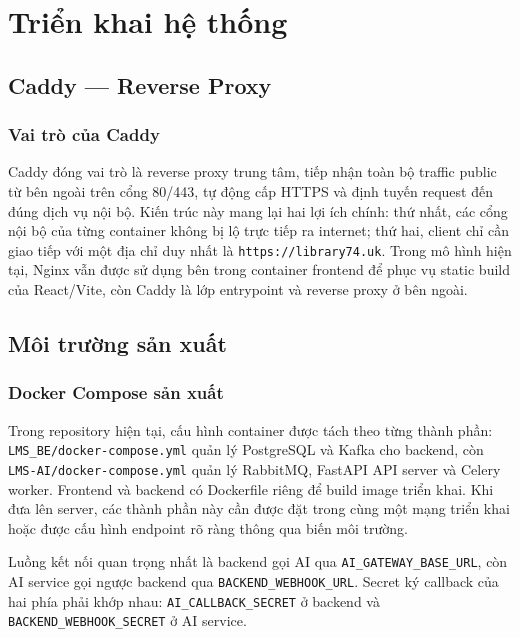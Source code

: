 \chapter{Triển khai hệ thống}

\section{Caddy --- Reverse Proxy}

\subsection{Vai trò của Caddy}

Caddy đóng vai trò là reverse proxy trung tâm, tiếp nhận toàn bộ traffic public
từ bên ngoài trên cổng 80/443, tự động cấp HTTPS và định tuyến request đến đúng
dịch vụ nội bộ. Kiến trúc này mang lại hai lợi ích chính: thứ nhất, các cổng
nội bộ của từng container không bị lộ trực tiếp ra internet; thứ hai, client chỉ
cần giao tiếp với một địa chỉ duy nhất là \texttt{https://library74.uk}. Trong
mô hình hiện tại, Nginx vẫn được sử dụng bên trong container frontend để phục vụ
static build của React/Vite, còn Caddy là lớp entrypoint và reverse proxy ở bên
ngoài.

\section{Môi trường sản xuất}

\subsection{Docker Compose sản xuất}

Trong repository hiện tại, cấu hình container được tách theo từng thành phần:
\texttt{LMS\_BE/docker-compose.yml} quản lý PostgreSQL và Kafka cho backend,
còn \texttt{LMS-AI/docker-compose.yml} quản lý RabbitMQ, FastAPI API server và
Celery worker. Frontend và backend có Dockerfile riêng để build image triển
khai. Khi đưa lên server, các thành phần này cần được đặt trong cùng một mạng
triển khai hoặc được cấu hình endpoint rõ ràng thông qua biến môi trường.

Luồng kết nối quan trọng nhất là backend gọi AI qua
\texttt{AI\_GATEWAY\_BASE\_URL}, còn AI service gọi ngược backend qua
\texttt{BACKEND\_WEBHOOK\_URL}. Secret ký callback của hai phía phải khớp nhau:
\texttt{AI\_CALLBACK\_SECRET} ở backend và \texttt{BACKEND\_WEBHOOK\_SECRET}
ở AI service.

